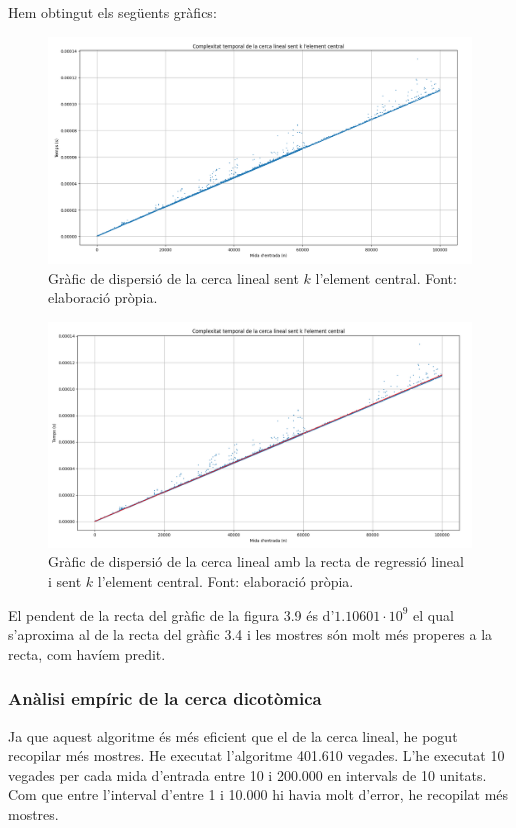 Hem obtingut els següents gràfics:
\begin{figure}[H]
    \centering
    \includegraphics[width=1\textwidth]{capitols/figures/linearmidscatter.png}
    \caption[Gràfic de dispersió de la cerca lineal sent $k$ l'element central.]{Gràfic de dispersió de la cerca lineal sent $k$ l'element central. Font: elaboració pròpia.}
    \label{fig:my_label}
\end{figure}
\begin{figure}[H]
    \centering
    \includegraphics[width=1\textwidth]{capitols/figures/linearmidscatterline.png}
    \caption[Gràfic de dispersió de la cerca lineal amb la recta de regressió lineal i sent $k$ l'element central.]{Gràfic de dispersió de la cerca lineal amb la recta de regressió lineal i sent $k$ l'element central. Font: elaboració pròpia.}
    \label{fig:my_label}
\end{figure}

El pendent de la recta del gràfic de la figura 3.9 és d'$1.10601 \cdot 10^9$ el qual s'aproxima al de la recta del gràfic 3.4 i les mostres són molt més properes a la recta, com havíem predit.

\subsubsection{Anàlisi empíric de la cerca dicotòmica}
Ja que aquest algoritme és més eficient que el de la cerca lineal, he pogut recopilar més mostres. He executat l'algoritme 401.610 vegades. L'he executat 10 vegades per cada mida d'entrada entre 10 i 200.000 en intervals de 10 unitats. Com que entre l'interval d'entre 1 i 10.000 hi havia molt d'error, he recopilat més mostres.

